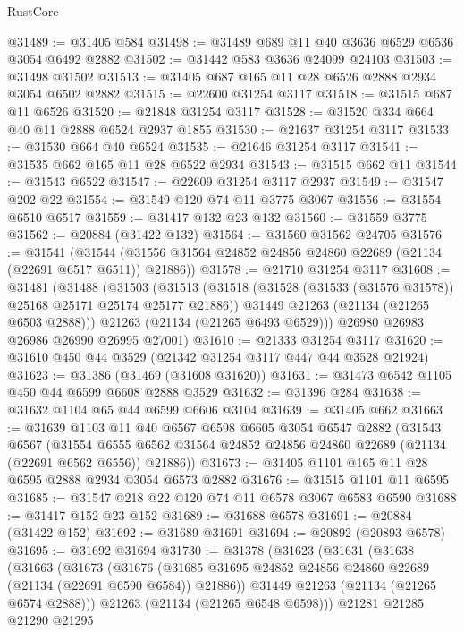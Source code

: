 \begin{lexlean}{RustCore}
\begin{coremodule}
@31489 := @31405 @584
@31498 := @31489 @689 @11 @40 @3636 @6529 @6536 @3054 @6492 @2882
@31502 := @31442 @583 @3636 @24099 @24103
@31503 := @31498 @31502
@31513 := @31405 @687 @165 @11 @28 @6526 @2888 @2934 @3054 @6502 @2882
@31515 := @22600 @31254 @3117
@31518 := @31515 @687 @11 @6526
@31520 := @21848 @31254 @3117
@31528 := @31520 @334 @664 @40 @11 @2888 @6524 @2937 @1855
@31530 := @21637 @31254 @3117
@31533 := @31530 @664 @40 @6524
@31535 := @21646 @31254 @3117
@31541 := @31535 @662 @165 @11 @28 @6522 @2934
@31543 := @31515 @662 @11
@31544 := @31543 @6522
@31547 := @22609 @31254 @3117 @2937
@31549 := @31547 @202 @22
@31554 := @31549 @120 @74 @11 @3775 @3067
@31556 := @31554 @6510 @6517
@31559 := @31417 @132 @23 @132
@31560 := @31559 @3775
@31562 := @20884 (@31422 @132)
@31564 := @31560 @31562 @24705
@31576 := @31541
    (@31544 (@31556 @31564 @24852 @24856 @24860 @22689 (@21134 (@22691 @6517 @6511)) @21886))
@31578 := @21710 @31254 @3117
@31608 := @31481
    (@31488
      (@31503
        (@31513
          (@31518 (@31528 (@31533 (@31576 @31578)) @25168 @25171 @25174 @25177 @21886))
          @31449
          @21263
          (@21134 (@21265 @6503 @2888)))
        @21263
        (@21134 (@21265 @6493 @6529)))
      @26980
      @26983
      @26986
      @26990
      @26995
      @27001)
@31610 := @21333 @31254 @3117
@31620 := @31610 @450 @44 @3529 (@21342 @31254 @3117 @447 @44 @3528 @21924)
@31623 := @31386 (@31469 (@31608 @31620))
@31631 := @31473 @6542 @1105 @450 @44 @6599 @6608 @2888 @3529
@31632 := @31396 @284
@31638 := @31632 @1104 @65 @44 @6599 @6606 @3104
@31639 := @31405 @662
@31663 := @31639
    @1103
    @11
    @40
    @6567
    @6598
    @6605
    @3054
    @6547
    @2882
    (@31543
      @6567
      (@31554 @6555 @6562 @31564 @24852 @24856 @24860 @22689 (@21134 (@22691 @6562 @6556)) @21886))
@31673 := @31405 @1101 @165 @11 @28 @6595 @2888 @2934 @3054 @6573 @2882
@31676 := @31515 @1101 @11 @6595
@31685 := @31547 @218 @22 @120 @74 @11 @6578 @3067 @6583 @6590
@31688 := @31417 @152 @23 @152
@31689 := @31688 @6578
@31691 := @20884 (@31422 @152)
@31692 := @31689 @31691
@31694 := @20892 (@20893 @6578)
@31695 := @31692 @31694
@31730 := @31378
    (@31623
      (@31631
        (@31638
          (@31663
            (@31673
              (@31676
                (@31685 @31695 @24852 @24856 @24860 @22689 (@21134 (@22691 @6590 @6584)) @21886))
              @31449
              @21263
              (@21134 (@21265 @6574 @2888)))
            @21263
            (@21134 (@21265 @6548 @6598)))
          @21281
          @21285
          @21290
          @21295

\end{coremodule}
\end{lexlean}
